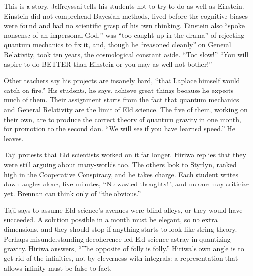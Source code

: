 
This is a story. Jeffreyssai tells his students not to try to do as well as Einstein. Einstein did not comprehend Bayesian methods, lived before the cognitive biases were found and had no scientific grasp of his own thinking. Einstein also ``spoke nonsense of an impersonal God,'' was ``too caught up in the drama'' of rejecting quantum mechanics to fix it, and, though he ``reasoned cleanly'' on General Relativity, took ten years, the cosmological constant aside. ``Too slow!''  ``You will aspire to do BETTER than Einstein or you may as well not bother!'' 

Other teachers say his projects are insanely hard, ``that Laplace himself would catch on fire.'' His students, he says, achieve great things because he expects much of them. Their assignment starts from the fact that quantum mechanics and General Relativity are the limit of Eld science. The five of them, working on their own, are to produce the correct theory of quantum gravity in one month, for promotion to the second dan. ``We will see if you have learned speed.'' He leaves. 

Taji protests that Eld scientists worked on it far longer. Hiriwa replies that they were still arguing about many-worlds too. The others look to Styrlyn, ranked high in the Cooperative Conspiracy, and he takes charge. Each student writes down angles alone, five minutes, ``No wasted thoughts!'', and no one may criticize yet.  Brennan can think only of ``the obvious.''

Taji says to assume Eld science's avenues were blind alleys, or they would have succeeded. A solution possible in a month must be elegant, so no extra dimensions, and they should stop if anything starts to look like string theory. Perhaps misunderstanding decoherence led Eld science astray in quantizing gravity. Hiriwa answers, ``The opposite of folly is folly.'' Hiriwa's own angle is to get rid of the infinities, not by cleverness with integrals: a representation that allows infinity must be false to fact.

